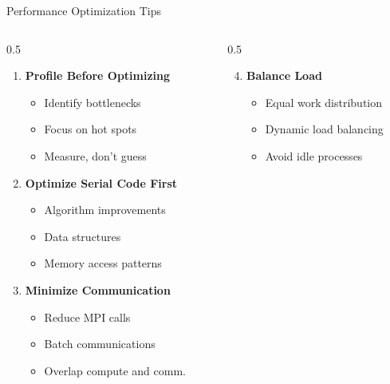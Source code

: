 \documentclass[aspectratio=169,xcolor={dvipsnames}]{beamer}
\begin{document}
\begin{frame}{Performance Optimization Tips}
	\vspace{-1em}
    \footnotesize
    \begin{columns}[T]
        \begin{column}{0.5\textwidth}
            \begin{enumerate}
                \item \textbf{Profile Before Optimizing}
                \begin{itemize}
                    \item Identify bottlenecks
                    \item Focus on hot spots
                    \item Measure, don't guess
                \end{itemize}

                \item \textbf{Optimize Serial Code First}
                \begin{itemize}
                    \item Algorithm improvements
                    \item Data structures
                    \item Memory access patterns
                \end{itemize}

                \item \textbf{Minimize Communication}
                \begin{itemize}
                    \item Reduce MPI calls
                    \item Batch communications
                    \item Overlap compute and comm.
                \end{itemize}
            \end{enumerate}
        \end{column}
        \begin{column}{0.5\textwidth}
            \begin{enumerate}
                \setcounter{enumi}{3}
                \item \textbf{Balance Load}
                \begin{itemize}
                    \item Equal work distribution
                    \item Dynamic load balancing
                    \item Avoid idle processes
                \end{itemize}


\end{enumerate}
\end{column}
\end{columns}
\end{frame}
\end{document}
